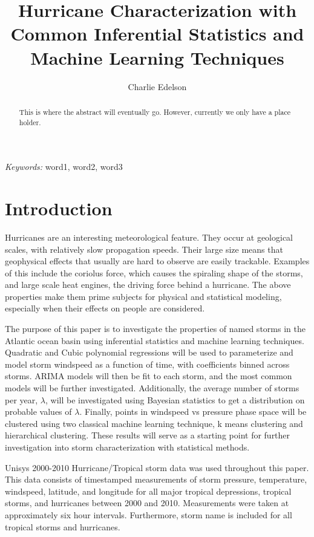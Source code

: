 \documentclass{article}
\title{Hurricane Characterization with Common Inferential Statistics and Machine Learning Techniques}
\author{Charlie Edelson}
\date{}
\providecommand{\keywords}[1]{\small{\textit{Keywords:} #1}}
\begin{document}
	
	\maketitle

	\begin{abstract}
	This is where the abstract will eventually go. However, currently we only have a place holder.
	\end{abstract}
	
	\keywords{word1, word2, word3}

	\section{Introduction}
	Hurricanes are an interesting meteorological feature. They occur at geological scales, with relatively slow propagation speeds. Their large size means that geophysical effects that usually are hard to observe are easily trackable. Examples of this include the coriolus force, which causes the spiraling shape of the storms, and large scale heat engines, the driving force behind a hurricane. The above properties make them prime subjects for physical and statistical modeling, especially when their effects on people are considered.
	
	The purpose of this paper is to investigate the properties of named storms in the Atlantic ocean basin using inferential 
statistics and machine learning techniques. Quadratic and Cubic polynomial regressions will be used to parameterize and model storm 
windspeed as a function of time, with coefficients binned across storms. ARIMA models will then be fit to each storm, and the most common 
models will be further investigated. Additionally, the average number of storms per year, $\lambda$, will be investigated using Bayesian 
statistics to get a distribution on probable values of $\lambda$. Finally, points in windspeed vs pressure phase space will be clustered 
using two classical machine learning technique, k means clustering and hierarchical clustering. These results will serve as a starting point for further investigation into storm characterization with statistical methods.

	Unisys 2000-2010 Hurricane/Tropical storm data was used throughout this paper\cite{Unisys}. This data consists of timestamped 
measurements of storm pressure, temperature, windspeed, latitude, and longitude for all major tropical depressions, tropical storms, and 
hurricanes between 2000 and 2010. Measurements were taken at approximately six hour intervals. Furthermore, storm name is included for all 
tropical storms and hurricanes.
\end{document}
